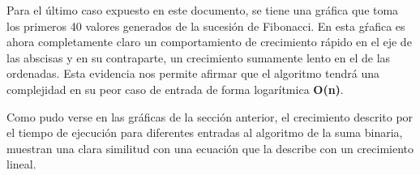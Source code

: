 \documentclass{report}
\begin{document}
\begin{center}
            Para el último caso expuesto en este documento, se tiene una gráfica que toma los primeros 40 valores generados de la sucesión de Fibonacci. En esta gŕafica es ahora completamente claro un comportamiento de crecimiento rápido en el eje de las abscisas y en su contraparte, un crecimiento sumamente lento en el de las ordenadas. Esta evidencia nos permite afirmar que el algoritmo tendrá una complejidad en su peor caso de entrada de forma logarítmica \textbf{O(n)}.
            \end{center}
            Como pudo verse en las gráficas de la sección anterior, el crecimiento descrito por el tiempo de ejecución para diferentes entradas al algoritmo de la suma binaria, muestran una clara similitud con una ecuación que la describe con un crecimiento lineal.\\
            
\end{document}
